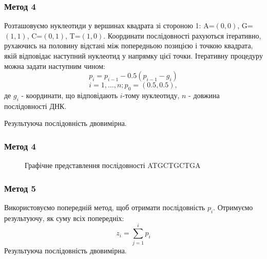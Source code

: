 \documentclass[mathserif,serif,10pt]{beamer}
\begin{document}
\begin{frame}
\frametitle{Метод 4}
Розташовуємо нуклеотиди у вершинах квадрата зі стороною 1: A=$(0,0)$,
G=$(1,1)$, C=$(0,1)$, T=$(1,0)$. Координати послідовності рахуються ітеративно,
рухаючись на половину відстані між попередньою позицією і точкою квадрата, якій
відповідає наступний нуклеотид у напрямку цієї точки. Ітеративну процедуру
можна задати наступним чином:
\[p_i = p_{i-1}-0.5(p_{i-1}-g_i)\]
\[i=1,...,n; p_0=(0.5,0.5),\]
де $g_i$ - координати, що відповідають $i$-тому нуклеотиду, $n$ - довжина послідовності ДНК.
\par
Результуюча послідовність двовимірна.
\end{frame}

\begin{frame}
\frametitle{Метод 4}
\begin{figure}[h!]
\begin{center}
\end{center}
\caption{Графічне представлення послідовності ATGCTGCTGA}
\label{fig:f2}
\end{figure}
\end{frame}

\begin{frame}
\frametitle{Метод 5}

Використовуємо попередній метод, щоб отримати послідовність $p_i$. Отримуємо результуючу, як суму всіх попередніх:
\[z_i = \sum_{j=1}^{i} p_i\]
Результуюча послідовність двовимірна.
\par
\end{frame}
\end{document}
